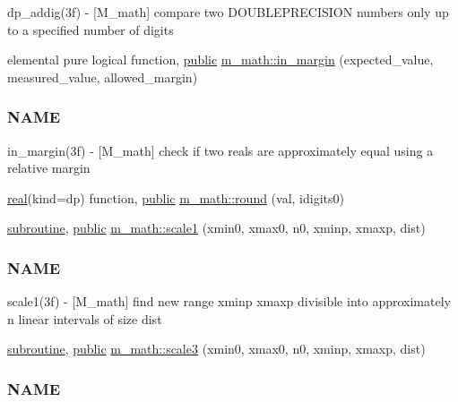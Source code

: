 \begin{DoxyCompactItemize}
\begin{DoxyCompactList}
dp\+\_\+addig(3f) -\/ \mbox{[}M\+\_\+math\mbox{]} compare two D\+O\+U\+B\+L\+E\+P\+R\+E\+C\+I\+S\+I\+ON numbers only up to a specified number of digits \end{DoxyCompactList}\item 
elemental pure logical function, \hyperlink{M__stopwatch_83_8txt_a2f74811300c361e53b430611a7d1769f}{public} \hyperlink{namespacem__math_aa53768584a404262081f26d5d61e1e03}{m\+\_\+math\+::in\+\_\+margin} (expected\+\_\+value, measured\+\_\+value, allowed\+\_\+margin)
\begin{DoxyCompactList}\small\item\em \subsubsection*{N\+A\+ME}

in\+\_\+margin(3f) -\/ \mbox{[}M\+\_\+math\mbox{]} check if two reals are approximately equal using a relative margin \end{DoxyCompactList}\item 
\hyperlink{read__watch_83_8txt_abdb62bde002f38ef75f810d3a905a823}{real}(kind=dp) function, \hyperlink{M__stopwatch_83_8txt_a2f74811300c361e53b430611a7d1769f}{public} \hyperlink{namespacem__math_a11ed560b0452d8338ff4958a88cab4de}{m\+\_\+math\+::round} (val, idigits0)
\item 
\hyperlink{M__stopwatch_83_8txt_acfbcff50169d691ff02d4a123ed70482}{subroutine}, \hyperlink{M__stopwatch_83_8txt_a2f74811300c361e53b430611a7d1769f}{public} \hyperlink{namespacem__math_aa12c4a23dac498e04f8bff1340fc8b30}{m\+\_\+math\+::scale1} (xmin0, xmax0, n0, xminp, xmaxp, dist)
\begin{DoxyCompactList}\small\item\em \subsubsection*{N\+A\+ME}

scale1(3f) -\/ \mbox{[}M\+\_\+math\mbox{]} find new range xminp xmaxp divisible into approximately n linear intervals of size dist \end{DoxyCompactList}\item 
\hyperlink{M__stopwatch_83_8txt_acfbcff50169d691ff02d4a123ed70482}{subroutine}, \hyperlink{M__stopwatch_83_8txt_a2f74811300c361e53b430611a7d1769f}{public} \hyperlink{namespacem__math_a2cf8b035165dd4c2c2ad0af1709dadfb}{m\+\_\+math\+::scale3} (xmin0, xmax0, n0, xminp, xmaxp, dist)
\begin{DoxyCompactList}\small\item\em \subsubsection*{N\+A\+ME}


\end{DoxyCompactList}
\end{DoxyCompactItemize}
